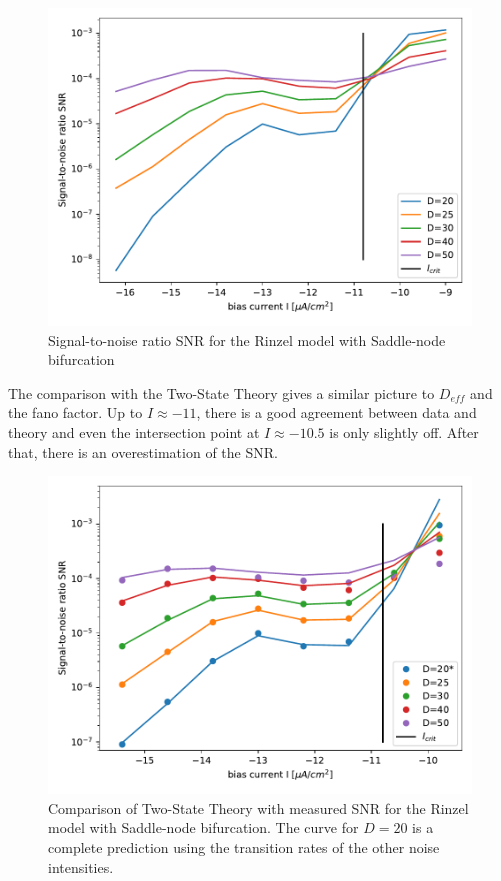 \documentclass[12pt,a4paper]{article}
\begin{document}
\begin{figure}[H]
	\centering
	\includegraphics[scale=1]{snrinzelonlycrit.pdf}\caption{Signal-to-noise ratio SNR for the Rinzel model with Saddle-node bifurcation}
	\label{specrinzel}
\end{figure}
The comparison with the Two-State Theory gives a similar picture to $D_{eff}$ and the fano factor. Up to $I\approx-11$, there is a good agreement between data and theory and even the intersection point at $I\approx-10.5$ is only slightly off. After that, there is an overestimation of the SNR.  
\begin{figure}[H]
	\centering
	\includegraphics[scale=1]{snrinzelrange26dcompletecritnofit3.pdf}\caption{Comparison of Two-State Theory with measured SNR for the Rinzel model with Saddle-node bifurcation. The curve for $D=20$ is a complete prediction using the transition rates of the other noise intensities.}
	\label{specrinzeltst}
\end{figure}
\end{document}
